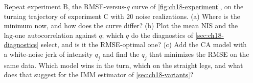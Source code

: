 \begin{exercise}[\difficulty{3}]
\label{exr:ch18-tuning}
Repeat experiment B, the RMSE-versus-$q$ curve of \cref{fig:ch18-experiment},
on the turning trajectory of experiment C with $20$ noise realizations. (a)
Where is the minimum now, and how does the curve differ? (b) Plot the mean
NIS and the lag-one autocorrelation against $q$; which $q$ do the diagnostics
of \cref{sec:ch18-diagnostics} select, and is it the RMSE-optimal one? (c)
Add the CA model with a white-noise jerk of intensity $q_j$ and find the
$q_j$ that minimizes the RMSE on the same data. Which model wins in the turn,
which on the straight legs, and what does that suggest for the IMM estimator
of \cref{sec:ch18-variants}?
\end{exercise}
